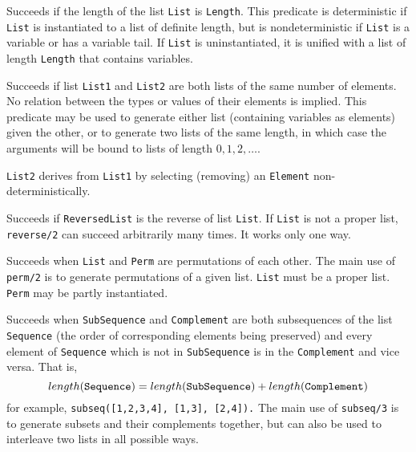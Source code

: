 \begin{description}
    Succeeds if the length of the list {\tt List} is {\tt Length}.
    This predicate is deterministic if {\tt List} is instantiated 
    to a list of definite length, but is nondeterministic if 
    {\tt List} is a variable or has a variable tail.  If {\tt List}
    is uninstantiated, it is unified with a list of length {\tt Length}
    that contains variables.

    Succeeds if list {\tt List1} and {\tt List2} are both lists of
    the same number of elements.  No relation between the types or
    values of their elements is implied.  This predicate may be used
    to generate either list (containing variables as elements) given
    the other, or to generate two lists of the same length, in which
    case the arguments will be bound to lists of length $0,1,2,\ldots$.

    {\tt List2} derives from {\tt List1} by selecting (removing) an 
    {\tt Element} non-deterministically.

    Succeeds if {\tt ReversedList} is the reverse of list {\tt List}.
    If {\tt List} is not a proper list, {\tt reverse/2} can succeed
    arbitrarily many times.  It works only one way.

    Succeeds when {\tt List} and {\tt Perm} are permutations of each
    other.  The main use of {\tt perm/2} is to generate permutations
    of a given list.  {\tt List} must be a proper list.
    {\tt Perm} may be partly instantiated.

    Succeeds when {\tt SubSequence} and {\tt Complement} are both
    subsequences of the list {\tt Sequence} (the order of corresponding
    elements being preserved) and every element of {\tt Sequence} which
    is not in {\tt SubSequence} is in the {\tt Complement} and vice
    versa.  That is,
    \[ length({\tt Sequence}) =
                length({\tt SubSequence})+length({\tt Complement}) \]
    for example, {\tt subseq([1,2,3,4], [1,3], [2,4]).}
    The main use of {\tt subseq/3} is to generate subsets and their
    complements together, but can also be used to interleave two lists
    in all possible ways.


\end{description}
